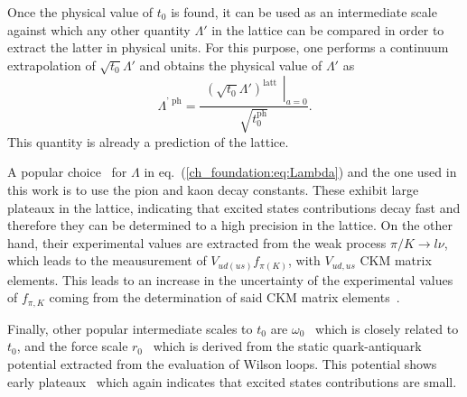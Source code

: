Once the physical value of $t_0$ is found, it can be used as an intermediate scale against which any other quantity $\Lambda'$ in the lattice can be compared in order to extract the latter in physical units. For this purpose, one performs a continuum extrapolation of $\sqrt{t_0}\Lambda'$ and obtains the physical value of $\Lambda'$ as
\begin{equation}
\Lambda^{\textrm{' ph}}=\frac{\left.\begin{matrix}
\left(\sqrt{t_0}\Lambda'\right)^{\textrm{latt}}
\end{matrix}\right|_{a=0}}{\sqrt{t_0^{\textrm{ph}}}}.
\end{equation}
This quantity is already a prediction of the lattice.

A popular choice~\citep{Brown:2018jtv,BMW:2012hcm,BMW:2012hcm,Bruno:2016plf,Strassberger:2023xnj} for $\Lambda$ in eq.~(\ref{ch_foundation:eq:Lambda}) and the one used in this work is to use the pion and kaon decay constants. These exhibit large plateaux in the lattice, indicating that excited states contributions decay fast and therefore they can be determined to a high precision in the lattice. On the other hand, their experimental values are extracted from the weak process $\pi/K\to l\nu$, which leads to the meausurement of $V_{ud(us)}f_{\pi(K)}$, with $V_{ud,us}$ CKM matrix elements. This leads to an increase in the uncertainty of the experimental values of $f_{\pi,K}$ coming from the determination of said CKM matrix elements~\citep{FlavourLatticeAveragingGroupFLAG:2021npn}.

Finally, other popular intermediate scales to $t_0$ are $\omega_0$~\citep{BMW:2012hcm,Kostrzewa:2021syw,MILC:2015tqx} which is closely related to $t_0$, and the force scale $r_0$~\citep{Sommer:1993ce,Necco:2001xg,Bernard:2000gd} which is derived from the static quark-antiquark potential extracted from the evaluation of Wilson loops. This potential shows early plateaux~\citep{Sommer:2014mea} which again indicates that excited states contributions are small.

